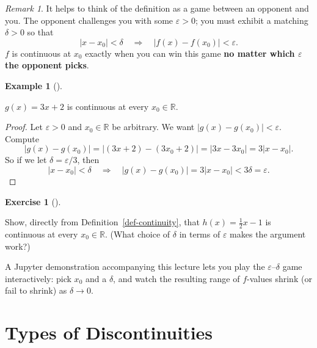 \documentclass[
  letterpaper,
  DIV=11,
  numbers=noendperiod]{scrreprt}
\theoremstyle{plain}
\theoremstyle{plain}
\theoremstyle{definition}
\theoremstyle{definition}
\newtheorem{exercise}{Exercise}[chapter]
\theoremstyle{definition}
\newtheorem{example}{Example}[chapter]
\theoremstyle{plain}
\theoremstyle{plain}
\theoremstyle{remark}
\newtheorem{refremark}{Remark}[chapter]
\begin{document}
\begin{refremark}
It helps to think of the definition as a game between an opponent and
you. The opponent challenges you with some \(\varepsilon>0\); you must
exhibit a matching \(\delta>0\) so that \[
\lvert x-x_0 \rvert<\delta \quad \Rightarrow \quad\lvert f(x)-f(x_0) \rvert<\varepsilon.
\] \(f\) is continuous at \(x_0\) exactly when you can win this game
\textbf{no matter which \(\varepsilon\) the opponent picks}.

\label{rem-epsilon-delta-game}

\end{refremark}

\begin{example}[]\protect\hypertarget{exm-linear-continuous}{}\label{exm-linear-continuous}

\hfill\break
\(g(x) = 3x+2\) is continuous at every \(x_0\in\mathbb{R}\).

\begin{proof}
Let \(\varepsilon>0\) and \(x_0\in\mathbb{R}\) be arbitrary. We want
\(\lvert g(x)-g(x_0) \rvert<\varepsilon\). Compute \[
\lvert g(x)-g(x_0) \rvert = \lvert (3x+2)-(3x_0+2) \rvert = \lvert 3x-3x_0 \rvert = 3\lvert x-x_0 \rvert.
\] So if we let \(\delta = \varepsilon/3\), then \[
\lvert x-x_0 \rvert<\delta \quad \Rightarrow \quad\lvert g(x)-g(x_0) \rvert = 3\lvert x-x_0 \rvert < 3\delta = \varepsilon.
\]
\end{proof}

\end{example}

\begin{exercise}[]\protect\hypertarget{exr-half-x-continuous}{}\label{exr-half-x-continuous}

Show, directly from Definition~\ref{def-continuity}, that
\(h(x) = \tfrac12 x - 1\) is continuous at every \(x_0\in\mathbb{R}\).
(What choice of \(\delta\) in terms of \(\varepsilon\) makes the
argument work?)

\end{exercise}

A Jupyter demonstration accompanying this lecture lets you play the
\(\varepsilon\)--\(\delta\) game interactively: pick \(x_0\) and a
\(\delta\), and watch the resulting range of \(f\)-values shrink (or
fail to shrink) as \(\delta\to 0\).

\section{Types of Discontinuities}\label{types-of-discontinuities}
\end{document}
